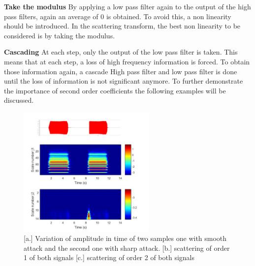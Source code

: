 \documentclass[hidelinks,12pt]{report}
\begin{document}
\textbf{Take the modulus}
By applying a low pass filter again to the output of the high pass filters, again an average of 0 is obtained. To avoid this, a non linearity should be introduced. In the scattering transform, the best non linearity to be considered is by taking the modulus.\par
\textbf{Cascading}
At each step, only the output of the low pass filter is taken. This means that at each step, a loss of high frequency information is forced. To obtain those information again, a cascade High pass filter and low pass filter is done until the loss of information is not significant anymore. To further demonstrate the importance of second order coefficients the following examples will be discussed.\par
\begin{figure}[t!]
  
  \centering
	    \includegraphics[width=0.6\textwidth]{att}
    \caption{[a.] Variation of amplitude in time of two samples one with smooth attack and the second one with sharp attack. [b.] scattering of order 1 of both signals [c.] scattering of order 2 of both signals }
    \label{attack}
\end{figure}
\end{document}
